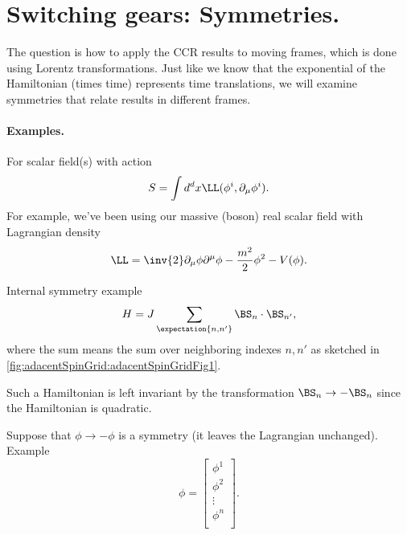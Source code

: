 %
%
\section{Switching gears: Symmetries.}

The question is how to apply the CCR results to moving frames, which is done using Lorentz transformations.  Just like we know that the exponential of the Hamiltonian (times time) represents time translations, we will examine symmetries that relate results in different frames.

\paragraph{Examples.}

For scalar field(s) with action
\begin{equation}\label{eqn:qftLecture6:880}
S = \int d^d x \LL(\phi^i, \partial_\mu \phi^i).
\end{equation}
For example, we've been using our massive (boson) real scalar field with Lagrangian density
\begin{equation}\label{eqn:qftLecture6:900}
\LL = \inv{2} \partial_\mu \phi\partial^\mu \phi - \frac{m^2}{2} \phi^2 - V(\phi).
\end{equation}

Internal symmetry example
\begin{equation}\label{eqn:qftLecture6:920}
H = J \sum_{\expectation{n, n'}} \BS_n \cdot \BS_{n'},
\end{equation}
where the sum means the sum over neighboring indexes \( n, n' \) as sketched in
\cref{fig:adacentSpinGrid:adacentSpinGridFig1}.

Such a Hamiltonian is left invariant by the transformation \( \BS_n \rightarrow -\BS_n \) since the Hamiltonian is quadratic.

Suppose that \( \phi \rightarrow -\phi\) is a symmetry (it leaves the Lagrangian unchanged).  Example
\begin{equation}\label{eqn:qftLecture6:940}
\phi =
\begin{bmatrix}
\phi^1 \\
\phi^2 \\
\vdots \\
\phi^n \\
\end{bmatrix}.
\end{equation}

